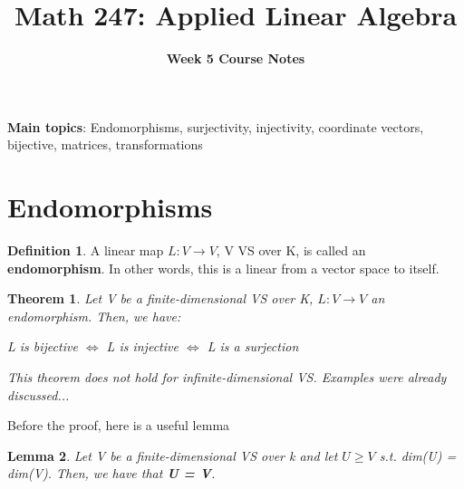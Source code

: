\documentclass[a4paper, 12pt]{article}
\title{\textbf{Math 247: Applied Linear Algebra} \vspace{-2ex}}
\author{\textbf{Week 5 Course Notes} \vspace{-2ex}}
\date{}
\newtheorem{theorem}{Theorem}
\newtheorem{lemma}[theorem]{Lemma}
\renewcommand{\arraystretch}{1.0}
\theoremstyle{definition}
\theoremstyle{definition}
\newtheorem{defn}{Definition}[section]
\theoremstyle{definition}
\theoremstyle{definition}
\begin{document}
\maketitle
\textbf{Main topics}: Endomorphisms, surjectivity, injectivity, coordinate vectors, bijective, matrices, transformations

\pagestyle{fancy}
\rhead{}
\lfoot{}
\cfoot{}
\renewcommand{\headrulewidth}{0.4pt}
\renewcommand{\footrulewidth}{0.4pt}
\setlength{\tabcolsep}{0.5em} %
{\renewcommand{\arraystretch}{1.2}%

\section{Endomorphisms}

\begin{defn}
	A linear map $L : V \rightarrow V$, V VS over K, is called an \textbf{endomorphism}. In other words, this is a linear from a vector space to itself. 
\end{defn}

\begin{theorem}
	Let V be a finite-dimensional VS over K, $L: V \rightarrow V$ an endomorphism. Then, we have: 
\begin{center}
	L is bijective $\iff$ L is injective $\iff$ L is a surjection 
\end{center}
This theorem does not hold for infinite-dimensional VS. Examples were already discussed...
\end{theorem}
Before the proof, here is a useful lemma
\begin{lemma}
	Let V be a finite-dimensional VS over k and let $U \geq V$ s.t. dim(U) = dim(V). Then, we have that \textbf{U = V}. 
\end{lemma}

}
\end{document}

